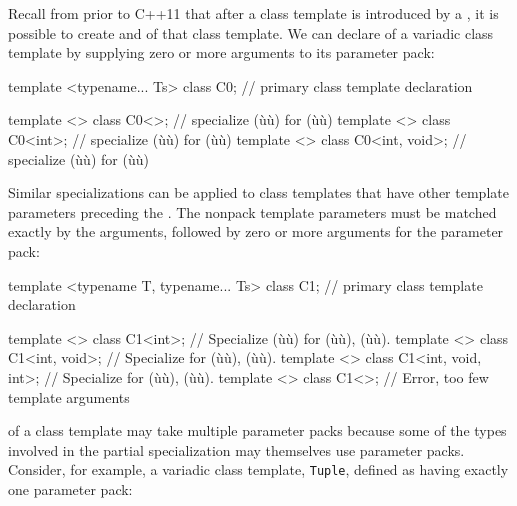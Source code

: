 Recall from prior to C++11 that after a class template is introduced by
a , it is possible to create
 and  of that
class template. We can declare  of a variadic
class template by supplying zero or more arguments to its parameter
pack:

\begin{emcppslisting}
template <typename... Ts> class C0;  // primary class template declaration

template <> class C0<>;              // specialize (ù{}ù) for (ù{}ù)
template <> class C0<int>;           // specialize (ù{}ù) for (ù{}ù)
template <> class C0<int, void>;     // specialize (ù{}ù) for (ù{}ù)
\end{emcppslisting}
    

\noindent Similar specializations can be applied to class templates that have
other template parameters preceding the . The nonpack template parameters must be matched exactly by the
arguments, followed by zero or more arguments for the parameter pack:

\begin{emcppslisting}
template <typename T, typename... Ts>
class C1;                              // primary class template declaration

template <> class C1<int>;             // Specialize (ù{}ù) for (ù{}ù), (ù{}ù).
template <> class C1<int, void>;       // Specialize for (ù{}ù), (ù{}ù).
template <> class C1<int, void, int>;  // Specialize for (ù{}ù), (ù{}ù).
template <> class C1<>;                // Error, too few template arguments
\end{emcppslisting}
    

\noindent {} of a class template may take multiple
parameter packs because some of the types involved in the partial
specialization may themselves use parameter packs. Consider, for
example, a variadic class template, \lstinline!Tuple!, defined as having
exactly one parameter pack:

